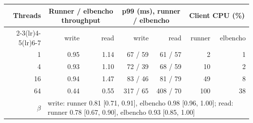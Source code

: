 \begin{tabular}{rrrrrrr}
\toprule
Threads & \multicolumn{2}{c}{Runner / elbencho throughput} & \multicolumn{2}{c}{p99 (ms), runner / elbencho} & \multicolumn{2}{c}{Client CPU (\%)} \\
\cmidrule(lr){2-3}\cmidrule(lr){4-5}\cmidrule(lr){6-7}
 & write & read & write & read & runner & elbencho \\
\midrule
1 & 0.95 & 1.14 & 67 / 59 & 61 / 57 & 2 & 1 \\
4 & 0.93 & 1.10 & 72 / 39 & 68 / 59 & 10 & 2 \\
16 & 0.94 & 1.47 & 83 / 46 & 81 / 79 & 49 & 8 \\
64 & 0.44 & 0.55 & 317 / 65 & 408 / 70 & 100 & 38 \\
\midrule
$\beta$ & \multicolumn{6}{l}{write: runner 0.81 [0.71, 0.91], elbencho 0.98 [0.96, 1.00]; read: runner 0.78 [0.67, 0.90], elbencho 0.93 [0.85, 1.00]} \\
\bottomrule
\end{tabular}
